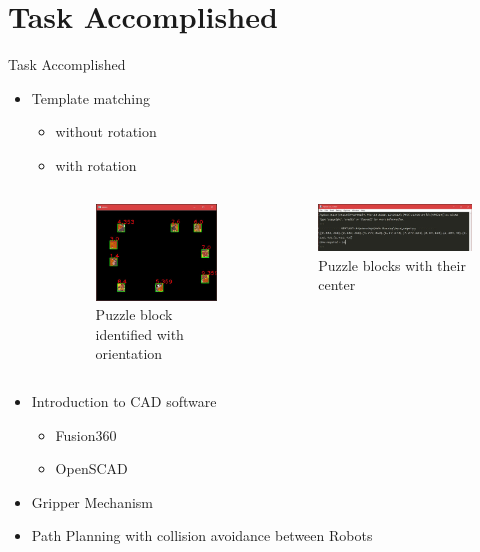 \documentclass[10pt,a4paper]{beamer}
\begin{document}
\section{Task Accomplished}
\begin{frame}{Task Accomplished}
\begin{itemize}
\color{blue}
\item Template matching
\begin{itemize}
\color{olive}
\item without rotation
\item with rotation
\begin{columns}
\column{0.5\framewidth}
\begin{figure}
\includegraphics[height=0.35\textheight]{template.jpg}\caption{Puzzle block identified with orientation}
\end{figure}
\column{0.5\framewidth}
\begin{figure}
\includegraphics[height=0.3\textheight, width=1\textwidth]{templatem.jpg}\caption{Puzzle blocks with their center}
\end{figure}
\end{columns}
\end{itemize}
\item Introduction to CAD software
\begin{itemize}
\color{olive}
\item Fusion360
\item OpenSCAD
\end{itemize}
\item Gripper Mechanism
\item Path Planning with collision avoidance between Robots
\end{itemize}
\end{frame}
\end{document}
